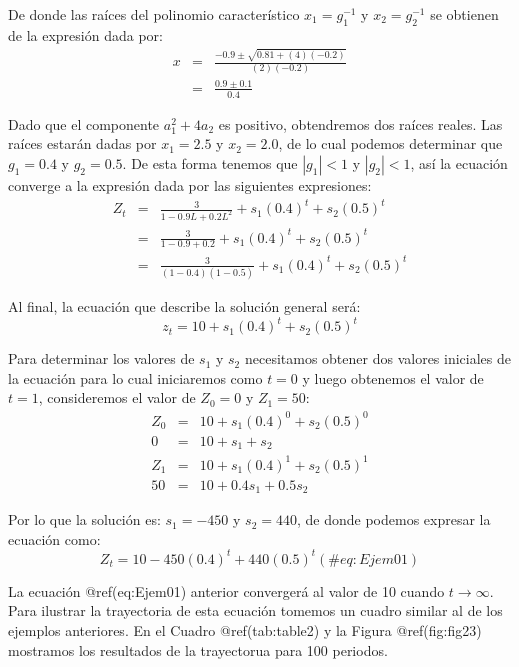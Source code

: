 \documentclass[
  a4paper,
]{article}
\begin{document}
De donde las raíces del polinomio característico \(x_1 = g_1^{-1}\) y
\(x_2 = g_2^{-1}\) se obtienen de la expresión dada por:
\begin{eqnarray}
    x & = &\frac{-0.9 \pm \sqrt{0.81 + (4)(-0.2)}}{(2)(-0.2)} \nonumber \\
    & = & \frac{0.9 \pm 0.1}{0.4} \nonumber
\end{eqnarray}

Dado que el componente \(a^2_1 + 4 a_2\) es positivo, obtendremos dos
raíces reales. Las raíces estarán dadas por \(x_1 = 2.5\) y
\(x_2 = 2.0\), de lo cual podemos determinar que \(g_1 = 0.4\) y
\(g_2 = 0.5\). De esta forma tenemos que \(|g_1| < 1\) y \(|g_2| < 1\),
así la ecuación converge a la expresión dada por las siguientes
expresiones: \begin{eqnarray}
    Z_t & = & \frac{3}{1 - 0.9 L + 0.2 L^2} + s_1 (0.4)^t + s_2 (0.5)^t \nonumber \\
    & = & \frac{3}{1 - 0.9 + 0.2} + s_1 (0.4)^t + s_2 (0.5)^t \nonumber \\
    & = & \frac{3}{(1 - 0.4)(1 - 0.5)} + s_1 (0.4)^t + s_2 (0.5)^t \nonumber
\end{eqnarray}

Al final, la ecuación que describe la solución general será: \[
    z_t = 10 + s_1 (0.4)^t + s_2 (0.5)^t
\]

Para determinar los valores de \(s_1\) y \(s_2\) necesitamos obtener dos
valores iniciales de la ecuación para lo cual iniciaremos como \(t = 0\)
y luego obtenemos el valor de \(t = 1\), consideremos el valor de
\(Z_0 = 0\) y \(Z_1 = 50\): \begin{eqnarray*}
    Z_0 & = & 10 + s_1(0.4)^0  + s_2(0.5)^0 \\
    0 & = & 10 + s_1 + s_2 \\
    Z_1 & = & 10 + s_1(0.4)^1  + s_2(0.5)^1 \\
    50 & = & 10 + 0.4 s_1 + 0.5 s_2
\end{eqnarray*}

Por lo que la solución es: \(s_1 = -450\) y \(s_2 = 440\), de donde
podemos expresar la ecuación como: \[
    Z_t = 10 - 450(0.4)^t + 440(0.5)^t
(\#eq:Ejem01)
\]

La ecuación @ref(eq:Ejem01) anterior convergerá al valor de 10 cuando
\(t \rightarrow \infty\). Para ilustrar la trayectoria de esta ecuación
tomemos un cuadro similar al de los ejemplos anteriores. En el Cuadro
@ref(tab:table2) y la Figura @ref(fig:fig23) mostramos los resultados de
la trayectorua para 100 periodos.
\end{document}
